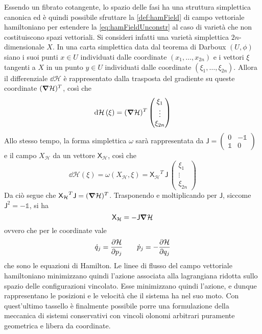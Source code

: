 Essendo un fibrato cotangente, lo spazio delle fasi ha una struttura simplettica canonica ed è quindi possibile sfruttare la \autoref{def:hamField} di campo vettoriale hamiltoniano per estendere la \autoref{eq:hamFieldUnconstr} al caso di varietà che non costituiscono spazi vettoriali. Si consideri infatti una varietà simplettica $2n$-dimensionale $X$. In una carta simplettica data dal teorema di Darboux $(U,\phi)$ siano i suoi punti $x \in U$ individuati dalle coordinate $(x_1, \ldots, x_{2n})$ e i vettori $\xi$ tangenti a $X$ in un punto $y \in U$ individuati dalle coordinate $(\xi_1, \ldots, \xi_{2n})$. Allora il differenziale $\dd{\mathcal{H}}$ è rappresentato dalla trasposta del gradiente su queste coordinate $(\grad{\mathcal{H}})^T$, così che \begin{equation*}
\dd{\mathcal{H}}(\xi) = (\grad{\mathcal{H}})^T \begin{pmatrix} \xi_1\\ \vdots\\ \xi_{2n} \end{pmatrix}
\end{equation*} 
Allo stesso tempo, la forma simplettica $\omega$ sarà rappresentata da $\mathsf{J} = \left( \begin{smallmatrix}
  0 & -\mathbb{1} \\ \mathbb{1} & 0
\end{smallmatrix}  \right) $ e il campo $X_{\mathcal{H}}$ da un vettore $\mathsf{X_{\mathcal{H}}}$, così che
\begin{equation*}
\dd{\mathcal{H}}(\xi) = \omega(X_{\mathcal{H}}, \xi) = \mathsf{X_{\mathcal{H}}}^T\, \mathsf{J}\, \begin{pmatrix} \xi_1\\ \vdots\\ \xi_{2n} \end{pmatrix}
\end{equation*} 
Da ciò segue che $\mathsf{X_{\mathcal{H}}}^T \mathsf{J} = (\grad{\mathcal{H}})^T$. Trasponendo e moltiplicando per $\mathsf{J}$, siccome $\mathsf{J}^2 =- \mathbb{1}$, si ha
\begin{equation*}
\mathsf{X}_{\mathcal{H}} = -\mathsf{J} \grad{\mathcal{H}} 
\end{equation*}
ovvero che per le coordinate vale \begin{equation*}
\dot{q}_j = \pdv{\mathcal{H}}{p_j} \qquad \dot{p}_j = - \pdv{\mathcal{H}}{q_j}
\end{equation*}
che sono le equazioni di Hamilton. Le linee di flusso del campo vettoriale hamiltoniano minimizzano quindi l'azione associata alla lagrangiana ridotta sullo spazio delle configurazioni vincolato. Esse minimizzano quindi l'azione, e dunque rappresentano le posizioni e le velocità che il sistema ha nel suo moto. Con quest'ultimo tassello è finalmente possibile porre una formulazione della meccanica di sistemi conservativi con vincoli olonomi arbitrari puramente geometrica e libera da coordinate.

